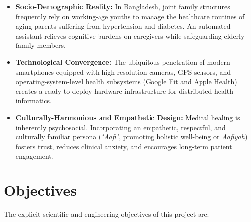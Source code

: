 \documentclass[12pt,a4paper,oneside]{report}
\begin{document}
\begin{itemize}
    \item \textbf{Socio-Demographic Reality:} In Bangladesh, joint family structures frequently rely on working-age youths to manage the healthcare routines of aging parents suffering from hypertension and diabetes. An automated assistant relieves cognitive burdens on caregivers while safeguarding elderly family members.
    \item \textbf{Technological Convergence:} The ubiquitous penetration of modern smartphones equipped with high-resolution cameras, GPS sensors, and operating-system-level health subsystems (Google Fit and Apple Health) creates a ready-to-deploy hardware infrastructure for distributed health informatics.
    \item \textbf{Culturally-Harmonious and Empathetic Design:} Medical healing is inherently psychosocial. Incorporating an empathetic, respectful, and culturally familiar persona (\textit{"Aafi"}, promoting holistic well-being or \textit{Aafiyah}) fosters trust, reduces clinical anxiety, and encourages long-term patient engagement.
\end{itemize}

\chapter{Objectives}

The explicit scientific and engineering objectives of this project are:
\end{document}
